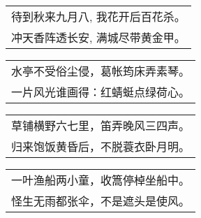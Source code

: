 \noindent\begin{minipage}{\linewidth}
  \vskip-3pt\begin{table}[H]
    \centering
    \begin{tabular}{@{}l@{}}
待到秋来九月八, 我花开后百花杀。\\
冲天香阵透长安, 满城尽带黄金甲。
    \end{tabular}
  \end{table}
\end{minipage}
\vspace{1cm}


\noindent\begin{minipage}{\linewidth}
  \vskip-3pt\begin{table}[H]
    \centering
    \begin{tabular}{@{}l@{}}
水亭不受俗尘侵，葛帐筠床弄素琴。\\
一片风光谁画得：红蜻蜓点绿荷心。
    \end{tabular}
  \end{table}
\end{minipage}
\vspace{1cm}


\noindent\begin{minipage}{\linewidth}
  \vskip-3pt\begin{table}[H]
    \centering
    \begin{tabular}{@{}l@{}}
草铺横野六七里，笛弄晚风三四声。\\
归来饱饭黄昏后，不脱蓑衣卧月明。
    \end{tabular}
  \end{table}
\end{minipage}
\vspace{1cm}


\noindent\begin{minipage}{\linewidth}
  \vskip-3pt\begin{table}[H]
    \centering
    \begin{tabular}{@{}l@{}}
一叶渔船两小童，收篙停棹坐船中。\\
怪生无雨都张伞，不是遮头是使风。
    \end{tabular}
  \end{table}
\end{minipage}
\vspace{1cm}


